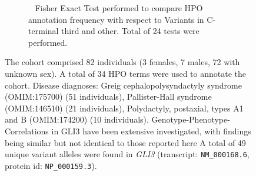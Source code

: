 \begin{figure}[htbp]
\vspace{0.4em}
\begin{subfigure}[b]{0.95\textwidth}
\centering
{}
\captionsetup{justification=raggedright,singlelinecheck=false}
\caption{         Fisher Exact Test performed to compare HPO annotation frequency with respect to Variants in C-terminal third and other. Total of
        24 tests were performed. }
\end{subfigure}
\vspace{0.4em}
\caption{ The cohort comprised 82 individuals (3 females, 7 males, 72 with unknown sex). A total of 34 HPO terms were used to annotate the cohort. Disease diagnoses: Greig cephalopolysyndactyly syndrome (OMIM:175700) (51 individuals), Pallister-Hall syndrome (OMIM:146510) (21 individuals), Polydactyly, postaxial, types A1 and B (OMIM:174200) (10 individuals). Genotype-Phenotype-Correlations in GLI3 have been extensive investigated, with findings being similar 
but not identical to those reported here \cite{PMID_15739154,PMID_22903559,PMID_33058447,PMID_24736735,PMID_9354780,PMID_28224613,PMID_34482537} A total of 49 unique variant alleles were found in \textit{GLI3} (transcript: \texttt{NM\_000168.6}, protein id: \texttt{NP\_000159.3}).}
\end{figure}
